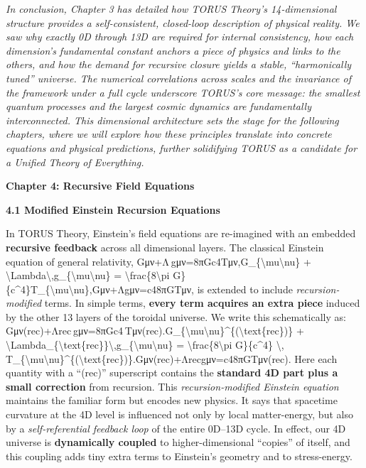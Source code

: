 \documentclass[
]{article}
\begin{document}
\emph{In conclusion, Chapter 3 has detailed how TORUS Theory's
14-dimensional structure provides a self-consistent, closed-loop
description of physical reality. We saw why exactly 0D through 13D are
required for internal consistency, how each dimension's fundamental
constant anchors a piece of physics and links to the others, and how the
demand for recursive closure yields a stable, ``harmonically tuned''
universe. The numerical correlations across scales and the invariance of
the framework under a full cycle underscore TORUS's core message: the
smallest quantum processes and the largest cosmic dynamics are
fundamentally interconnected. This dimensional architecture sets the
stage for the following chapters, where we will explore how these
principles translate into concrete equations and physical predictions,
further solidifying TORUS as a candidate for a Unified Theory of
Everything.}

\textbf{Chapter 4: Recursive Field Equations}

\textbf{4.1 Modified Einstein Recursion Equations}

In TORUS Theory, Einstein's field equations are re-imagined with an
embedded \textbf{recursive feedback} across all dimensional layers. The
classical Einstein equation of general relativity,
Gμν+Λ gμν=8πGc4Tμν,G\_\{\textbackslash mu\textbackslash nu\} +
\textbackslash Lambda\textbackslash,g\_\{\textbackslash mu\textbackslash nu\}
= \textbackslash frac\{8\textbackslash pi
G\}\{c\^{}4\}T\_\{\textbackslash mu\textbackslash nu\},Gμν\hspace{0pt}+Λgμν\hspace{0pt}=c48πG\hspace{0pt}Tμν\hspace{0pt},
is extended to include \emph{recursion-modified} terms. In simple terms,
\textbf{every term acquires an extra piece} induced by the other 13
layers of the toroidal universe. We write this schematically as:
Gμν(rec)+Λrec gμν=8πGc4 Tμν(rec).G\_\{\textbackslash mu\textbackslash nu\}\^{}\{(\textbackslash text\{rec\})\}
+
\textbackslash Lambda\_\{\textbackslash text\{rec\}\}\textbackslash,g\_\{\textbackslash mu\textbackslash nu\}
= \textbackslash frac\{8\textbackslash pi G\}\{c\^{}4\} \textbackslash,
T\_\{\textbackslash mu\textbackslash nu\}\^{}\{(\textbackslash text\{rec\})\}.Gμν(rec)\hspace{0pt}+Λrec\hspace{0pt}gμν\hspace{0pt}=c48πG\hspace{0pt}Tμν(rec)\hspace{0pt}.
Here each quantity with a ``(rec)'' superscript contains the
\textbf{standard 4D part plus a small correction} from recursion. This
\emph{recursion-modified Einstein equation} maintains the familiar form
but encodes new physics. It says that spacetime curvature at the 4D
level is influenced not only by local matter-energy, but also by a
\emph{self-referential feedback loop} of the entire 0D--13D
cycle\hspace{0pt}. In effect, our 4D universe is \textbf{dynamically
coupled} to higher-dimensional ``copies'' of itself, and this coupling
adds tiny extra terms to Einstein's geometry and to stress-energy.
\end{document}
